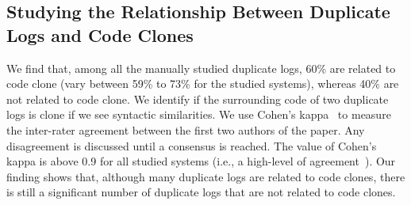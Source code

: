 



\subsection{Studying the Relationship Between Duplicate Logs and Code Clones}%

 We find that, among all the manually studied duplicate logs, 60\% are related to code clone (vary between 59\% to 73\% for the studied systems), whereas 40\% are not related to code clone. We identify if the surrounding code of two duplicate logs is clone if we see syntactic similarities. We use Cohen's kappa~\cite{kappa} to measure the inter-rater agreement between the first two authors of the paper. Any disagreement is discussed until a consensus is reached. %
The value of Cohen's kappa is above 0.9 for all studied systems (i.e., a high-level of agreement~\cite{kappa}). Our finding shows that, although many duplicate logs are related to code clones, there is still a significant number of duplicate logs that are not related to code clones. %

